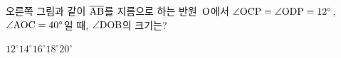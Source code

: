 \noindent\begin{minipage}[t]{0.58\linewidth}\vspace{0pt}\raggedright 오른쪽 그림과 같이 $\overline{\mathrm{AB}}$를 지름으로 하는 반원~$\mathrm{O}$에서 $\angle\mathrm{OCP}=\angle\mathrm{ODP}=12^\circ$, $\angle\mathrm{AOC}=40^\circ$일 때, $\angle\mathrm{DOB}$의 크기는?\end{minipage}\hfill\begin{minipage}[t]{0.4\linewidth}\vspace{0pt}\centering \resizebox{\ifdim\width>\linewidth\linewidth\else\width\fi}{!}{}\end{minipage}\par
\begin{choices32}{$12^\circ$}{$14^\circ$}{$16^\circ$}{$18^\circ$}{$20^\circ$}\end{choices32}
